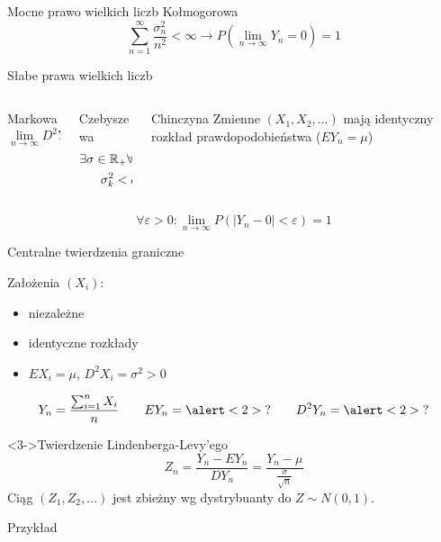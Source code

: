 \documentclass{mp}
\begin{document}
\begin{frame}{Mocne prawo wielkich liczb Kołmogorowa}
\[ \sum_{n=1}^\infty \frac{\sigma_n^2}{n^2}<\infty \to P(\lim_{n\to\infty} Y_n=0)=1 \]
\end{frame}
\begin{frame}{Słabe prawa wielkich liczb}
\begin{columns}[T]
\begin{column}{.30\textwidth}
{
\begin{block}{Markowa}
\[\lim_{n\to\infty} D^2Y_n=0 \]
\end{block}
}
\end{column}
\begin{column}{.30\textwidth}
{
\begin{block}{Czebyszewa}
\begin{gather*}
\exists \sigma\in\mathbb{R}_{+}\forall k\in\mathbb{N} \\
\sigma_k^2<\sigma^2
\end{gather*}
\end{block}
}
\end{column}
\begin{column}{.30\textwidth}
{
\begin{block}{Chinczyna}
Zmienne $(X_1, X_2, \ldots)$ mają identyczny rozkład prawdopodobieństwa
($EY_n=\mu$)
\end{block}
}
\end{column}
\end{columns}
\begin{block}{}
\[ \forall \varepsilon>0\colon \lim_{n\to\infty} P(\left|Y_n-0\right|<\varepsilon)=1 \]
\end{block}
\end{frame}
\begin{frame}{Centralne twierdzenia graniczne}
\begin{block}{Założenia}
$(X_i)$:
\begin{itemize}
\item niezależne
\item identyczne rozkłady
\item $EX_i=\mu$, $D^2X_i=\sigma^2>0$
\end{itemize}
{
\[ Y_n=\frac{\sum_{i=1}^n X_i}{n} \qquad EY_n=\alert<2>{?} \qquad D^2Y_n=\alert<2>{?} \]
}
\end{block}
\begin{block}<3->{Twierdzenie Lindenberga-Levy'ego}
\[ Z_n=\frac{Y_n-EY_n}{DY_n}=\frac{Y_n-\mu}{\frac{\sigma}{\sqrt{n}}} \]
Ciąg $(Z_1,Z_2,\ldots)$ jest zbieżny wg dystrybuanty do $Z\sim N(0,1)$.
\end{block}
\end{frame}
\begin{frame}{Przykład}
\center
{}
\end{frame}
\end{document}

